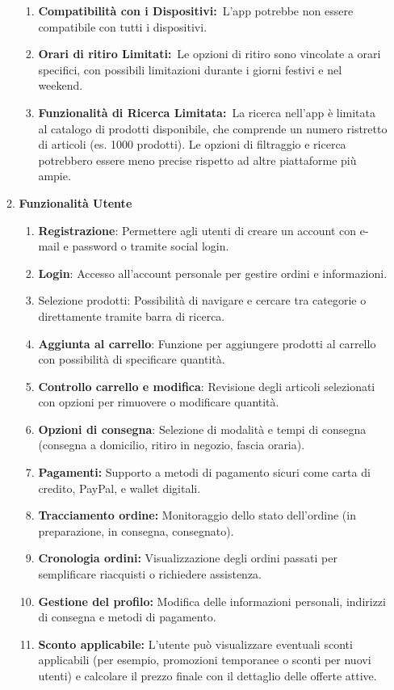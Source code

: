 \documentclass[a4paper,12pt]{article}
\begin{document}
\begin{enumerate}
\begin{enumerate}
\begin{enumerate}
   \item \textbf{Compatibilità con i Dispositivi:} L'app potrebbe non essere compatibile con tutti i dispositivi. 
   
   \item \textbf{Orari di ritiro Limitati:} Le opzioni di ritiro sono vincolate a orari specifici, con possibili limitazioni durante i giorni festivi e nel weekend.
   
   \item \textbf{Funzionalità di Ricerca Limitata:} La ricerca nell'app è limitata al catalogo di prodotti disponibile, che comprende un numero ristretto di articoli (es. 1000 prodotti). Le opzioni di filtraggio e ricerca potrebbero essere meno precise rispetto ad altre piattaforme più ampie. 
   \end{enumerate}
   
   \item\textbf{Funzionalità Utente}
   
       \begin{enumerate}[label=\arabic*.]
       \item  \textbf{Registrazione}: Permettere agli utenti di creare un account con e-mail e password o tramite social login.
       \item \textbf{Login}: Accesso all’account personale per gestire ordini e informazioni.
       \item Selezione prodotti: Possibilità di navigare e cercare tra categorie o direttamente tramite barra di ricerca.
       \item \textbf{Aggiunta al carrello}: Funzione per aggiungere prodotti al carrello con possibilità di specificare quantità.
       \item \textbf{Controllo carrello e modifica}: Revisione degli articoli selezionati con opzioni per rimuovere o modificare quantità.
       \item \textbf{Opzioni di consegna}: Selezione di modalità e tempi di consegna (consegna a domicilio, ritiro in negozio, fascia oraria).
       \item \textbf{Pagamenti:} Supporto a metodi di pagamento sicuri come carta di credito, PayPal, e wallet digitali.
       \item \textbf{Tracciamento ordine:} Monitoraggio dello stato dell’ordine (in preparazione, in consegna, consegnato).
       \item \textbf{Cronologia ordini:} Visualizzazione degli ordini passati per semplificare riacquisti o richiedere assistenza.
       \item \textbf{Gestione del profilo:} Modifica delle informazioni personali, indirizzi di consegna e metodi di pagamento.
       \item \textbf{Sconto applicabile:} L'utente può visualizzare eventuali sconti applicabili (per esempio, promozioni temporanee o sconti per nuovi utenti) e calcolare il prezzo finale con il dettaglio delle offerte attive.
       \end{enumerate}
   

\end{enumerate}
\end{enumerate}
\end{document}

